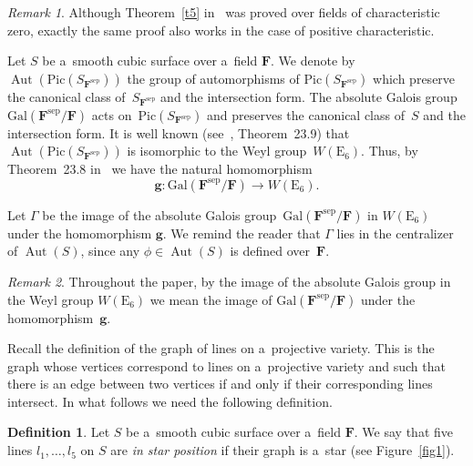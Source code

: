 \documentclass{amsart}
\numberwithin{equation}{section}
\theoremstyle{plain}
\theoremstyle{definition}
\newtheorem{definition}{Definition}
\theoremstyle{remark}
\newtheorem{remark}{Remark}
\begin{document}
\begin{remark}
\label{r3}
Although Theorem~\ref{t5} in~\cite{7} was proved over fields of characteristic zero, exactly the same proof also works in the case of positive characteristic.
\end{remark}

 Let $S$ be a~smooth cubic surface over a~field $\mathbf{F}$. We denote by
$\operatorname{Aut}(\mathrm{Pic}(S_{\mathbf{F}^{\mathrm{sep}}}))$ the group of automorphisms of $\mathrm{Pic}(S_{\mathbf{F}^{\mathrm{sep}}})$ which
preserve the canonical class of~$S_{\mathbf{F}^{\mathrm{sep}}}$ and the
intersection form. The absolute Galois
group $\mathrm{Gal}(\mathbf{F}^{\mathrm{sep}}/\mathbf{F})$ acts on~$\mathrm{Pic}(S_{\mathbf{F}^{\mathrm{sep}}})$ and preserves the canonical
class of~$S$ and the intersection form. It is well known
(see~\cite{14}, Theorem~23.9) that
$\operatorname{Aut}(\mathrm{Pic}(S_{\mathbf{F}^{\mathrm{sep}}}))$ is isomorphic to
the Weyl group~$W(\mathrm{E}_6)$. Thus, by Theorem~23.8 in~\cite{14} we have
the natural homomorphism
$$
\boldsymbol{g}\colon \mathrm{Gal}(\mathbf{F}^{\mathrm{sep}}/\mathbf{F}) \to W(\mathrm{E}_6).
$$

Let $\Gamma$ be the image of the absolute Galois group~$\mathrm{Gal}(\mathbf{F}^{\mathrm{sep}}/\mathbf{F})$ in $W(\mathrm{E}_6)$ under the homomorphism $\boldsymbol{g}$. We remind the reader that $\Gamma$ lies in the centralizer of $\operatorname{Aut}(S)$, since any $\phi \in \operatorname{Aut}(S)$ is defined over~$\mathbf{F}$.

\begin{remark}
\label{r4}
Throughout the paper, by the image of the absolute Galois group in the Weyl group $W(\mathrm{E}_6)$ we mean the image of $\mathrm{Gal}(\mathbf{F}^{\mathrm{sep}}/\mathbf{F})$ under the homomorphism~$\boldsymbol{g}$.
\end{remark}

Recall the definition of the graph of lines on a~projective variety. This is the graph whose vertices correspond to lines on a~projective variety and such that there is an edge between two vertices if and only if their corresponding lines intersect. In what follows we need the following definition.

\begin{definition}
\label{d2}
Let $S$ be a~smooth cubic surface over a~field $\mathbf{F}$. We say that five lines $l_1, \dots, l_5$ on $S$ are \textit{in star position} if their graph is a~star (see Figure~\ref{fig1}).
\end{definition}
\end{document}
